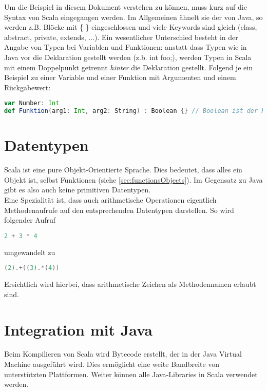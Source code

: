 Um die Beispiel in diesem Dokument verstehen zu können, muss kurz auf
die Syntax von Scala eingegangen werden. Im Allgemeinen ähnelt sie der
von Java, so werden z.B. Blöcke mit \{ \} eingeschlossen und viele
Keywords sind gleich (class, abstract, private, extends, ...).
Ein wesentlicher Unterschied besteht in der Angabe von Typen bei Variablen
und Funktionen: anstatt dass Typen wie in Java vor die Deklaration gestellt
werden (z.b. int foo;), werden Typen in Scala mit einem Doppelpunkt getrennt
\emph{hinter} die Deklaration gestellt. Folgend je ein Beispiel zu einer Variable
und einer Funktion mit Argumenten und einem Rückgabewert:

\begin{lstlisting}[float=ht,language=scala,caption=Typenangabe,label=lst:types]
var Number: Int
def Funktion(arg1: Int, arg2: String) : Boolean {} // Boolean ist der Rueckgabewert
\end{lstlisting}


\section{Datentypen}
\label{sec:datatypes}

Scala ist eine pure Objekt-Orientierte Sprache. Dies bedeutet, dass alles
ein Objekt ist, selbst Funktionen (siehe \ref{sec:functionsObjects}). Im
Gegensatz zu Java gibt es also auch keine primitiven Datentypen.\\

Eine Spezialität ist, dass auch arithmetische Operationen eigentlich
Methodenaufrufe auf den entsprechenden Datentypen darstellen. So wird
folgender Aufruf

\begin{lstlisting}[float=ht,language=scala,caption=Arithmetische Operationen,label=lst:arithmetic]
2 + 3 * 4
\end{lstlisting}

umgewandelt zu
\begin{lstlisting}[float=ht,language=scala,caption=Arithmetische Operationen konvertiert,label=lst:arithmeticConverted]
(2).+((3).*(4))
\end{lstlisting}

Ersichtlich wird hierbei, dass arithmetische Zeichen
als Methodennamen erlaubt sind. \\

\section{Integration mit Java}

Beim Kompilieren von Scala wird Bytecode erstellt, der in der Java
Virtual Machine ausgeführt wird. Dies ermöglicht eine weite Bandbreite
von unterstützten Plattformen. Weiter können alle Java-Libraries in
Scala verwendet werden.

